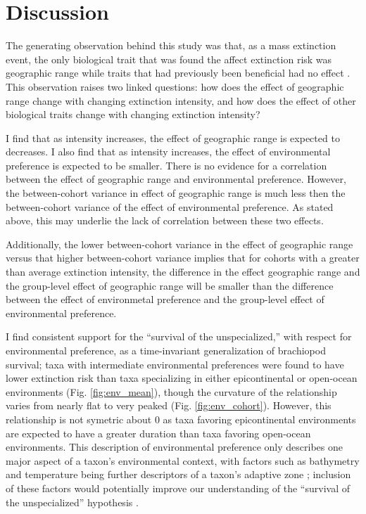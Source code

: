 \documentclass{article}
\begin{document}
\section{Discussion}

The generating observation behind this study was that, as a mass extinction event, the only biological trait that was found the affect extinction risk was geographic range while traits that had previously been beneficial had no effect \citep{Jablonski1986}. This observation raises two linked questions: how does the effect of geographic range change with changing extinction intensity, and how does the effect of other biological traits change with changing extinction intensity?

I find that as intensity increases, the effect of geographic range is expected to decreases. I also find that as intensity increases, the effect of environmental preference is expected to be smaller. There is no evidence for a correlation between the effect of geographic range and environmental preference. However, the between-cohort variance in effect of geographic range is much less then the between-cohort variance of the effect of environmental preference. As stated above, this may underlie the lack of correlation between these two effects.

Additionally, the lower between-cohort variance in the effect of geographic range versus that higher between-cohort variance implies that for cohorts with a greater than average extinction intensity, the difference in the effect geographic range and the group-level effect of geographic range will be smaller than the difference between the effect of environmetal preference and the group-level effect of environmental preference.

I find consistent support for the ``survival of the unspecialized,'' with respect for environmental preference, as a time-invariant generalization of brachiopod survival; taxa with intermediate environmental preferences were found to have lower extinction risk than taxa specializing in either epicontinental or open-ocean environments (Fig. \ref{fig:env_mean}), though the curvature of the relationship varies from nearly flat to very peaked (Fig. \ref{fig:env_cohort}). However, this relationship is not symetric about 0 as taxa favoring epicontinental environments are expected to have a greater duration than taxa favoring open-ocean environments. This description of environmental preference only describes one major aspect of a taxon's environmental context, with factors such as bathymetry and temperature being further descriptors of a taxon's adaptive zone \citep{Nurnberg2013a,Harnik2013,Harnik2011,Heim2011}; inclusion of these factors would potentially improve our understanding of the ``survival of the unspecialized'' hypothesis \citep{Simpson1944}.
\end{document}
